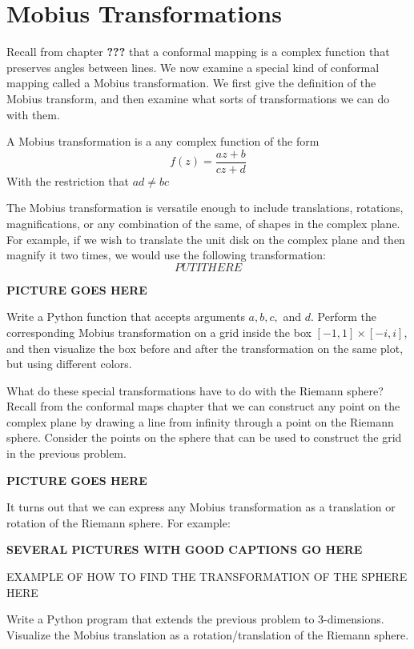 \section*{Mobius Transformations}

Recall from chapter {\bf ???} that a conformal mapping is a complex function that preserves angles between lines.  We now examine a special kind of conformal mapping called a Mobius transformation.  We first give the definition of the Mobius transform, and then examine what sorts of transformations we can do with them.

\begin{definition}  A Mobius transformation is a any complex function of the form
\[
f(z) = \frac{az + b}{cz + d}
\]
With the restriction that $ad \neq bc$
\end{definition}

The Mobius transformation is versatile enough to include translations, rotations, magnifications, or any combination of the same, of shapes in the complex plane.  For example, if we wish to translate the unit disk on the complex plane and then magnify it two times, we would use the following transformation:
\[
PUT IT HERE
\]

{\bf PICTURE GOES HERE}

\begin{problem} Write a Python function that accepts arguments $a,b,c,$ and $d$.  Perform the corresponding Mobius transformation on a grid inside the box $[-1,1]\times[-i,i]$, and then visualize the box before and after the transformation on the same plot, but using different colors.
\end{problem}

What do these special transformations have to do with the Riemann sphere?  Recall from the conformal maps chapter that we can construct any point on the complex plane by drawing a line from infinity through a point on the Riemann sphere.  Consider the points on the sphere that can be used to construct the grid in the previous problem.

{\bf PICTURE GOES HERE}

It turns out that we can express any Mobius transformation as a translation or rotation of the Riemann sphere.  For example:

{\bf SEVERAL PICTURES WITH GOOD CAPTIONS GO HERE}

EXAMPLE OF HOW TO FIND THE TRANSFORMATION OF THE SPHERE HERE

\begin{problem}  Write a Python program that extends the previous problem to 3-dimensions.  Visualize the Mobius translation as a rotation/translation of the Riemann sphere.
\end{problem}



